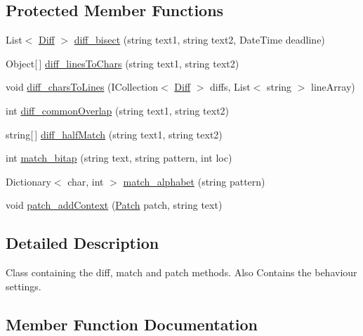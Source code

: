 \subsection*{Protected Member Functions}
\begin{DoxyCompactItemize}
\item 
List$<$ \hyperlink{class_diff_match_patch_1_1_diff}{Diff} $>$ \hyperlink{class_diff_match_patch_1_1diff__match__patch_a9b2a57109300a7ab6df63e67a89a7444}{diff\+\_\+bisect} (string text1, string text2, Date\+Time deadline)
\item 
Object\mbox{[}$\,$\mbox{]} \hyperlink{class_diff_match_patch_1_1diff__match__patch_a23490e8a85efeb603b0ba402cebd3832}{diff\+\_\+lines\+To\+Chars} (string text1, string text2)
\item 
void \hyperlink{class_diff_match_patch_1_1diff__match__patch_a34911313c72c6fd474a0d0ef080ad0fb}{diff\+\_\+chars\+To\+Lines} (I\+Collection$<$ \hyperlink{class_diff_match_patch_1_1_diff}{Diff} $>$ diffs, List$<$ string $>$ line\+Array)
\item 
int \hyperlink{class_diff_match_patch_1_1diff__match__patch_a844105aa12077562c4dd018caf168e75}{diff\+\_\+common\+Overlap} (string text1, string text2)
\item 
string\mbox{[}$\,$\mbox{]} \hyperlink{class_diff_match_patch_1_1diff__match__patch_abd865c4f93b686080d2e7360477f0aaa}{diff\+\_\+half\+Match} (string text1, string text2)
\item 
int \hyperlink{class_diff_match_patch_1_1diff__match__patch_a5b06852db0d05d7c304127f5607b28ee}{match\+\_\+bitap} (string text, string pattern, int loc)
\item 
Dictionary$<$ char, int $>$ \hyperlink{class_diff_match_patch_1_1diff__match__patch_afe674a45ed6c5fb11641632887cb8283}{match\+\_\+alphabet} (string pattern)
\item 
void \hyperlink{class_diff_match_patch_1_1diff__match__patch_a27b37fe59fd3e3b1831e9dd44dbdcf01}{patch\+\_\+add\+Context} (\hyperlink{class_diff_match_patch_1_1_patch}{Patch} patch, string text)
\end{DoxyCompactItemize}


\subsection{Detailed Description}
Class containing the diff, match and patch methods. Also Contains the behaviour settings. 

\subsection{Member Function Documentation}
\hypertarget{class_diff_match_patch_1_1diff__match__patch_a9b2a57109300a7ab6df63e67a89a7444}{}
